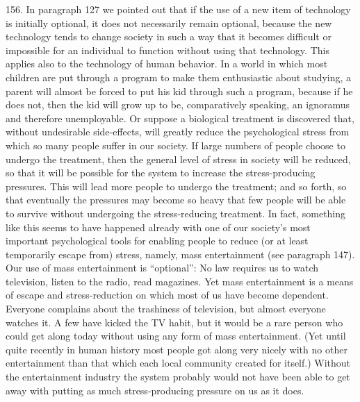 \documentclass{article}
\begin{document}
156. In paragraph 127 we pointed out that if the use of a new item of technology is initially 
optional, it does not necessarily remain optional, because the new technology tends to change 
society in such a way that it becomes difficult or impossible for an individual to function without 
using that technology. This applies also to the technology of human behavior. In a world in which 
most children are put through a program to make them enthusiastic about studying, a parent will 
almost be forced to put his kid through such a program, because if he does not, then the kid will 
grow up to be, comparatively speaking, an ignoramus and therefore unemployable. Or suppose a 
biological treatment is discovered that, without undesirable side-effects, will greatly reduce the 
psychological stress from which so many people suffer in our society. If large numbers of people 
choose to undergo the treatment, then the general level of stress in society will be reduced, so that 
it will be possible for the system to increase the stress-producing pressures. This will lead more 
people to undergo the treatment; and so forth, so that eventually the pressures may become so 
heavy that few people will be able to survive without undergoing the stress-reducing treatment. In 
fact, something like this seems to have happened already with one of our society’s most important 
psychological tools for enabling people to reduce (or at least temporarily escape from) stress, 
namely, mass entertainment (see paragraph 147). Our use of mass entertainment is “optional”: No 
law requires us to watch television, listen to the radio, read magazines. Yet mass entertainment is 
a means of escape and stress-reduction on which most of us have become dependent. Everyone 
complains about the trashiness of television, but almost everyone watches it. A few have kicked 
the TV habit, but it would be a rare person who could get along today without using any form of 
mass entertainment. (Yet until quite recently in human history most people got along very nicely 
with no other entertainment than that which each local community created for itself.) Without the 
entertainment industry the system probably would not have been able to get away with putting as 
much stress-producing pressure on us as it does. \vspace{\baselineskip}
\end{document}
